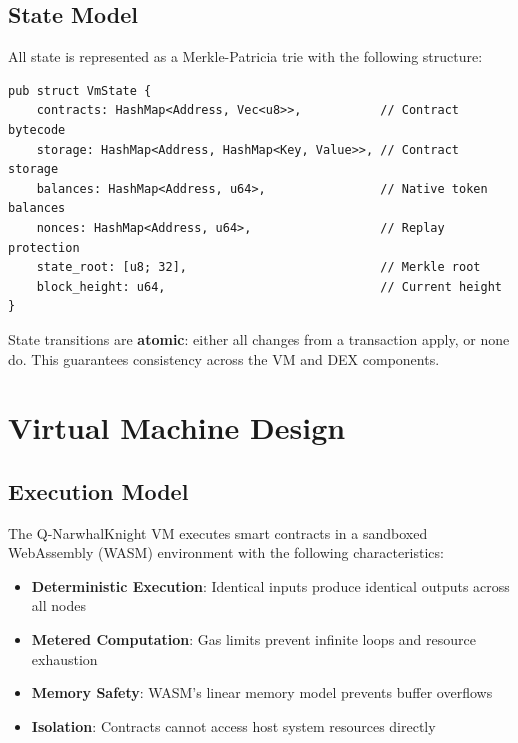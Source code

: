 \documentclass[11pt,a4paper]{article}
\begin{document}
\subsection{State Model}

All state is represented as a Merkle-Patricia trie with the following structure:

\begin{lstlisting}[style=rust]
pub struct VmState {
    contracts: HashMap<Address, Vec<u8>>,           // Contract bytecode
    storage: HashMap<Address, HashMap<Key, Value>>, // Contract storage
    balances: HashMap<Address, u64>,                // Native token balances
    nonces: HashMap<Address, u64>,                  // Replay protection
    state_root: [u8; 32],                           // Merkle root
    block_height: u64,                              // Current height
}
\end{lstlisting}

State transitions are \textbf{atomic}: either all changes from a transaction apply, or none do. This guarantees consistency across the VM and DEX components.

\section{Virtual Machine Design}

\subsection{Execution Model}

The Q-NarwhalKnight VM executes smart contracts in a sandboxed WebAssembly (WASM) environment with the following characteristics:

\begin{itemize}[leftmargin=*]
    \item \textbf{Deterministic Execution}: Identical inputs produce identical outputs across all nodes
    \item \textbf{Metered Computation}: Gas limits prevent infinite loops and resource exhaustion
    \item \textbf{Memory Safety}: WASM's linear memory model prevents buffer overflows
    \item \textbf{Isolation}: Contracts cannot access host system resources directly
\end{itemize}
\end{document}
